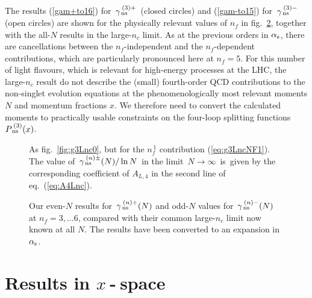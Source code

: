 \documentclass[12pt]{article}
\newcommand{\als}{\alpha_{\rm s}}
\def\nc{{n_c}}
\def\nf{{n^{}_{\! f}}}
\def\nfo{{n^{\,1}_{\! f}}}
\begin{document}
\bigskip

The results (\ref{gam+to16}) for $\,\gamma_{\,\rm ns}^{\:(3)+\,}$ (closed 
circles) and (\ref{gam-to15}) for $\,\gamma_{\,\rm ns}^{\:(3)-\,}$ (open
circles) are shown for the physically relevant values of $\nf$ in 
fig.~\ref{fig:g3Lnf3456}, together with the all-$N$ results in the large-$\nc$ 
limit. 
As at the previous orders in $\als$, there are 
cancellations between the $\nf$-independent and the \mbox{$\nf$-dependent} 
contributions, which are particularly pronounced here at $\nf = 5$.
For this number of light flavours, which is relevant for high-energy processes 
at the LHC, the large-$\nc$ result do not describe the (small) fourth-order QCD
contributions to the non-singlet evolution equations at the phenomenologically 
most relevant moments $N$ and momentum fractions $x$.
We therefore need to convert the calculated moments to practically usable 
constraints on the four-loop splitting functions $P_{\,\rm ns}^{\:(3)}(x)$.

\begin{figure}[p]
\vspace{-2mm}
\centerline{}
\vspace{-1mm}
\caption{ \label{fig:g3Lnc1} \small
 As fig.~\ref{fig:g3Lnc0}, but for the $\nfo$ contribution (\ref{eq:g3LncNF1}). 
 The value of $\,\gamma_{\,\rm ns}^{\:(n)\pm}(N) / \ln N\,$ in the limit
 $\,N \to \infty\,$ is~given by the corresponding coefficient of $A_{L,4}$ 
 in the second line of eq.~(\ref{eq:A4Lnc}).
 }
\vspace{-2mm}
\end{figure}
%
\begin{figure}[p]
\vspace{-2mm}
\centerline{}
\vspace{-1mm}
\caption{ \label{fig:g3Lnf3456} \small
 Our even-$N$ results for $\,\gamma_{\,\rm ns}^{\:(n)+}(N)$ and odd-$N$ 
 values for $\,\gamma_{\,\rm ns}^{\:(n)-}(N)$ at $\nf = 3, \ldots 6$, 
 compared with their common large-$\nc$ limit now known at all $N$.
 The results have been converted to an expansion in $\als$. 
 }
\vspace{-2mm}
\end{figure}

\newpage

%
\setcounter{equation}{0}
\section{Results in $x\:\!$-$\:\!$space}
\label{sec:Xres}
\end{document}
